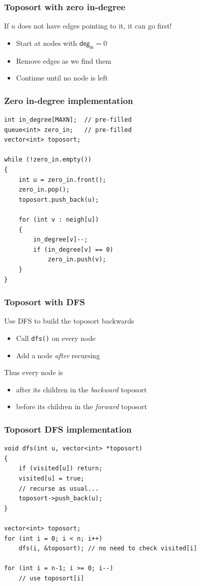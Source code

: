 \documentclass[12pt]{beamer}
\begin{document}
\begin{frame}
\frametitle{Toposort with zero in-degree}
If $u$ does not have edges pointing to it, it can go first!
\begin{itemize}
\item Start at nodes with $\mathsf{deg}_\mathsf{in} = 0$
\item Remove edges as we find them
\item Continue until no node is left
\end{itemize}
\end{frame}

\begin{frame}[fragile]
\frametitle{Zero in-degree implementation}
\begin{lstlisting}
int in_degree[MAXN];  // pre-filled
queue<int> zero_in;   // pre-filled
vector<int> toposort;

while (!zero_in.empty())
{
    int u = zero_in.front();
    zero_in.pop();
    toposort.push_back(u);
    
    for (int v : neigh[u])
    {
        in_degree[v]--;
        if (in_degree[v] == 0)
            zero_in.push(v);
    }
}
\end{lstlisting}
\end{frame}

\begin{frame}
\frametitle{Toposort with DFS}
Use DFS to build the toposort backwards
\begin{itemize}
\item Call \texttt{dfs()} on every node
\item Add a node \emph{after} recursing
\end{itemize}
Thus every node is
\begin{itemize}
\item after its children in the \emph{backward} toposort
\item before its children in the \emph{forward} toposort
\end{itemize}
\end{frame}

\begin{frame}[fragile]
\frametitle{Toposort DFS implementation}
\begin{lstlisting}
void dfs(int u, vector<int> *toposort)
{
    if (visited[u]) return;
    visited[u] = true;
    // recurse as usual...
    toposort->push_back(u);
}

vector<int> toposort;
for (int i = 0; i < n; i++)
    dfs(i, &toposort); // no need to check visited[i]

for (int i = n-1; i >= 0; i--)
    // use toposort[i]
\end{lstlisting}
\end{frame}
\end{document}
